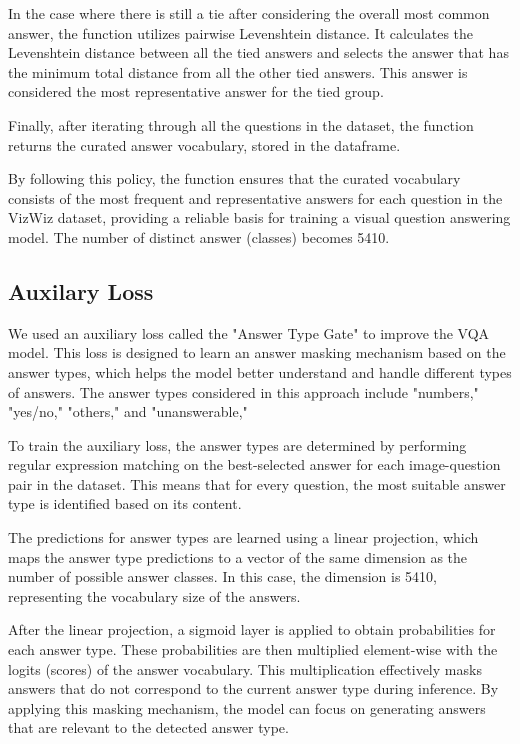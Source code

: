 \documentclass[final,5p,times,twocolumn,authoryear]{elsarticle}
\begin{document}
In the case where there is still a tie after considering the overall most common answer, the function utilizes pairwise Levenshtein distance. It calculates the Levenshtein distance between all the tied answers and selects the answer that has the minimum total distance from all the other tied answers. This answer is considered the most representative answer for the tied group.

Finally, after iterating through all the questions in the dataset, the function returns the curated answer vocabulary, stored in the dataframe.

By following this policy, the function ensures that the curated vocabulary consists of the most frequent and representative answers for each question in the VizWiz dataset, providing a reliable basis for training a visual question answering model. The number of distinct answer (classes) becomes 5410.

\subsection{Auxilary Loss}

We used an auxiliary loss called the "Answer Type Gate" to improve the VQA model. This loss is designed to learn an answer masking mechanism based on the answer types, which helps the model better understand and handle different types of answers. The answer types considered in this approach include "numbers," "yes/no," "others," and "unanswerable,"

To train the auxiliary loss, the answer types are determined by performing regular expression matching on the best-selected answer for each image-question pair in the dataset. This means that for every question, the most suitable answer type is identified based on its content.

The predictions for answer types are learned using a linear projection, which maps the answer type predictions to a vector of the same dimension as the number of possible answer classes. In this case, the dimension is 5410, representing the vocabulary size of the answers.

After the linear projection, a sigmoid layer is applied to obtain probabilities for each answer type. These probabilities are then multiplied element-wise with the logits (scores) of the answer vocabulary. This multiplication effectively masks answers that do not correspond to the current answer type during inference. By applying this masking mechanism, the model can focus on generating answers that are relevant to the detected answer type.
\end{document}
